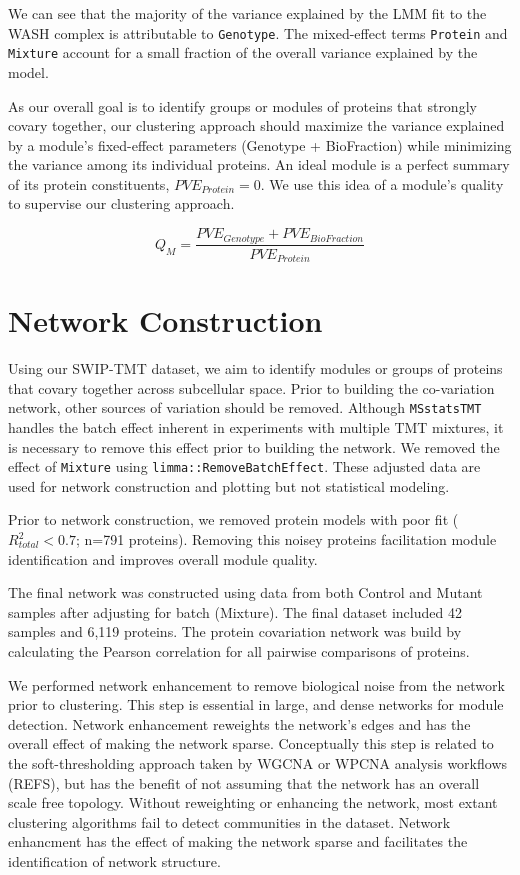 \documentclass[11pt]{elife}\usepackage[]{graphicx}\usepackage[]{color}
\begin{document}

We can see that the majority of the variance explained by the LMM fit to the
WASH complex is attributable to \texttt{Genotype}. The mixed-effect terms
\texttt{Protein} and \texttt{Mixture} account for a small fraction of the 
overall variance explained by the model.

As our overall goal is to identify groups or modules of proteins that strongly
covary together, our clustering approach should maximize the variance explained
by a module's fixed-effect parameters (Genotype + BioFraction) while minimizing 
the variance among its individual proteins. 
An ideal module is a perfect summary of its protein constituents, 
$PVE_{Protein}=0$. We use this idea of a module's quality to supervise our 
clustering approach.

\begin{equation}
	Q_{M}=\frac{PVE_{Genotype} + PVE_{BioFraction}}{PVE_{Protein}}
\end{equation}


\section{Network Construction}

Using our SWIP-TMT dataset, we aim to identify modules or groups of
proteins that covary together across subcellular space. Prior to building the
co-variation network, other sources of variation should be removed. Although
\texttt{MSstatsTMT} handles the batch effect inherent in experiments with
multiple TMT mixtures, it is necessary to remove this effect prior to building
the network. We removed the effect of \texttt{Mixture} using
\texttt{limma::RemoveBatchEffect}. These adjusted data are used for network
construction and plotting but not statistical modeling.

Prior to network construction, we removed protein models with poor fit 
($R^2_{total}<0.7$; n=791 proteins). Removing this noisey proteins facilitation
module identification and improves overall module quality.

The final network was constructed using data from both Control and Mutant 
samples after adjusting for batch (Mixture). The final dataset included 
42 samples and 6,119 proteins. The protein covariation network was build by
calculating the Pearson correlation for all pairwise comparisons of proteins.

We performed network enhancement to remove biological noise from the network
prior to clustering. This step is essential in large, and dense networks for
module detection. Network enhancement reweights the
network's edges and has the overall effect of making the network sparse.
Conceptually this step is related to the soft-thresholding approach taken by
WGCNA or WPCNA analysis workflows (REFS), but has the benefit of not assuming
that the network has an overall scale free topology.  Without reweighting or
enhancing the network, most extant clustering algorithms fail to detect
communities in the dataset.  Network enhancment has the effect of making the
network sparse and facilitates the identification of network structure.
\end{document}
